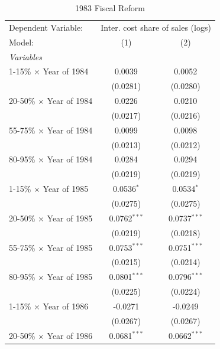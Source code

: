 \documentclass[
  12pt]{article}
\theoremstyle{definition}
\theoremstyle{remark}
\begin{document}
\hypertarget{tbl-did-1983}{}
\begingroup
\centering
\begin{table}
\caption{\label{tbl-did-1983}1983 Fiscal Reform }\tabularnewline

\centering
\begin{tabular}{lcc}
   \tabularnewline \midrule \midrule
   Dependent Variable: & \multicolumn{2}{c}{Inter. cost share of sales (logs)}\\
   Model:                          & (1)            & (2)\\  
   \midrule
   \emph{Variables}\\
   1-15\% $\times$ Year of 1984    & 0.0039         & 0.0052\\   
                                   & (0.0281)       & (0.0280)\\   
   20-50\% $\times$ Year of 1984   & 0.0226         & 0.0210\\   
                                   & (0.0217)       & (0.0216)\\   
   55-75\% $\times$ Year of 1984   & 0.0099         & 0.0098\\   
                                   & (0.0213)       & (0.0212)\\   
   80-95\% $\times$ Year of 1984   & 0.0284         & 0.0294\\   
                                   & (0.0219)       & (0.0219)\\   
   1-15\% $\times$ Year of 1985    & 0.0536$^{*}$   & 0.0534$^{*}$\\   
                                   & (0.0275)       & (0.0275)\\   
   20-50\% $\times$ Year of 1985   & 0.0762$^{***}$ & 0.0737$^{***}$\\   
                                   & (0.0219)       & (0.0218)\\   
   55-75\% $\times$ Year of 1985   & 0.0753$^{***}$ & 0.0751$^{***}$\\   
                                   & (0.0215)       & (0.0214)\\   
   80-95\% $\times$ Year of 1985   & 0.0801$^{***}$ & 0.0796$^{***}$\\   
                                   & (0.0225)       & (0.0224)\\   
   1-15\% $\times$ Year of 1986    & -0.0271        & -0.0249\\   
                                   & (0.0267)       & (0.0267)\\   
   20-50\% $\times$ Year of 1986   & 0.0681$^{***}$ & 0.0662$^{***}$\\   

\end{tabular}
\end{table}
\end{document}

